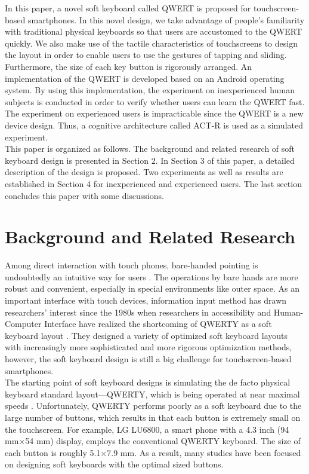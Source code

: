 \documentclass{singlecol-new}
\theoremstyle{TH}{
\newtheorem{lemma}{Lemma}
\newtheorem{theorem}[lemma]{Theorem}
\newtheorem{corrolary}[lemma]{Corrolary}
\newtheorem{conjecture}[lemma]{Conjecture}
\newtheorem{proposition}[lemma]{Proposition}
\newtheorem{claim}[lemma]{Claim}
\newtheorem{stheorem}[lemma]{Wrong Theorem}
\newtheorem{algorithm}{Algorithm}
}
\theoremstyle{THrm}{
\newtheorem{definition}{Definition}[section]
\newtheorem{question}{Question}[section]
\newtheorem{remark}{Remark}
\newtheorem{scheme}{Scheme}
}
\theoremstyle{THhit}{
\newtheorem{case}{Case}[section]
}
\begin{document}
In this paper, a novel soft keyboard called QWERT is proposed for touchscreen-based smartphones. In this novel design, we take advantage of people's familiarity with traditional physical keyboards so that users are accustomed to the QWERT quickly. We also make use of the tactile characteristics of touchscreens to design the layout in order to enable users to use the gestures of tapping and sliding. Furthermore, the size of each key button is rigorously arranged. An implementation of the QWERT is developed based on an Android operating system. By using this implementation, the experiment on inexperienced human subjects is conducted in order to verify whether users can learn the QWERT fast. The experiment on experienced users is impracticable since the QWERT is a new device design. Thus, a cognitive architecture called ACT-R is used as a simulated experiment.  \\

This paper is organized as follows. The background and related research of soft keyboard design is presented in Section 2. In Section 3 of this paper, a detailed description of the design is proposed. Two experiments as well as results are established in Section 4 for inexperienced and experienced users. The last section concludes this paper with some discussions.

\section{Background and Related Research}

Among direct interaction with touch phones, bare-handed pointing is undoubtedly an intuitive way for users \citep{albinsson2003high}. The operations by bare hands are more robust and convenient, especially in special environments like outer space. As an important interface with touch devices, information input method has drawn researchers' interest since the 1980s when researchers in accessibility and Human-Computer Interface have realized the shortcoming of QWERTY as a soft keyboard layout \citep{colle2004standing, park2010touch}. They designed a variety of optimized soft keyboard layouts with increasingly more sophisticated and more rigorous optimization methods, however, the soft keyboard design is still a big challenge for touchscreen-based smartphones. \\

The starting point of soft keyboard designs is simulating the de facto physical keyboard standard layout---QWERTY, which is being operated at near maximal speeds \citep{noyes1983qwerty}. Unfortunately, QWERTY performs poorly as a soft keyboard due to the large number of buttons, which results in that each button is extremely small on the touchscreen. For example, LG LU6800, a smart phone with a 4.3 inch (94 mm$\times$54 mm) display, employs the conventional QWERTY keyboard. The size of each button is roughly 5.1$\times$7.9 mm. As a result, many studies have been focused on designing soft keyboards with the optimal sized buttons. \\
\end{document}
